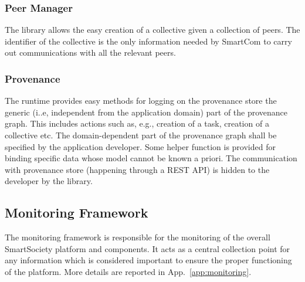 
\subsubsection{Peer Manager}
The library allows the easy creation of a collective given a collection of peers. The identifier of the collective is the only information needed by SmartCom to carry out communications with all the relevant peers. %

\subsubsection{Provenance}
The runtime provides easy methods for logging on the provenance store the generic (i..e, independent from the application domain) part of the provenance graph. This includes actions such as, e.g., creation of a task, creation of a collective etc. The domain-dependent part of the provenance graph shall be specified by the application developer.%
Some helper function is provided for binding specific data whose model cannot be known a priori.
The communication with provenance store (happening through a REST API) is hidden to the developer by the library.

\subsection{Monitoring Framework}
The monitoring framework is responsible for the monitoring of the overall SmartSociety platform and components. It acts as a central collection point for any information which is considered important to ensure the proper functioning of the platform. More details are reported in App.~\ref{app:monitoring}.


